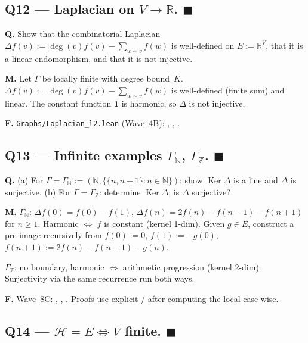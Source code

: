 \documentclass[11pt,a4paper]{article}
\newcommand{\done}[1]{\textcolor{donegreen}{\textbf{#1}}}
\newcommand{\lmod}[1]{\texttt{\small #1}}
\newcommand{\N}{\mathbb{N}}
\newcommand{\Z}{\mathbb{Z}}
\newcommand{\R}{\mathbb{R}}
\newcommand{\HH}{\mathcal{H}}
\renewcommand{\deg}{\operatorname{deg}}
\newcommand{\Ker}{\operatorname{Ker}}
\theoremstyle{plain}
\theoremstyle{definition}
\begin{document}
\subsection{Q12 --- Laplacian on $V \to \R$. \done{$\blacksquare$}}

\textbf{Q.} Show that the combinatorial Laplacian
$\Delta f(v) := \deg(v) f(v) - \sum_{w \sim v} f(w)$ is well-defined
on $E := \R^V$, that it is a linear endomorphism, and that it is
not injective.

\textbf{M.} Let $\Gamma$ be locally finite with degree bound~$K$.
$\Delta f(v) := \deg(v) f(v) - \sum_{w \sim v} f(w)$ is well-defined
(finite sum) and linear. The constant function $\mathbf 1$ is
harmonic, so $\Delta$ is not injective.

\textbf{F.} \lmod{Graphs/Laplacian\_l2.lean} (Wave~4B):
, ,
.

\subsection{Q13 --- Infinite examples $\Gamma_\N$, $\Gamma_\Z$. \done{$\blacksquare$}}

\textbf{Q.} (a) For $\Gamma = \Gamma_\N := (\N, \{\{n, n+1\} : n \in \N\})$:
show $\Ker \Delta$ is a line and $\Delta$ is surjective.
(b) For $\Gamma = \Gamma_\Z$: determine $\Ker \Delta$; is $\Delta$
surjective?

\textbf{M.}
\emph{$\Gamma_\N$}: $\Delta f(0) = f(0) - f(1)$, $\Delta f(n) =
2 f(n) - f(n-1) - f(n+1)$ for $n \geq 1$. Harmonic $\Leftrightarrow$
$f$ is constant (kernel 1-dim). Given $g \in E$, construct a
pre-image recursively from $f(0) := 0$, $f(1) := -g(0)$,
$f(n+1) := 2 f(n) - f(n-1) - g(n)$.

\emph{$\Gamma_\Z$}: no boundary, harmonic $\Leftrightarrow$ arithmetic
progression (kernel 2-dim). Surjectivity via the same recurrence run
both ways.

\textbf{F.} Wave~8C:
, ,
. Proofs use explicit
/ after computing the local
 case-wise.

\subsection{Q14 --- $\HH = E \iff V$ finite. \done{$\blacksquare$}}
\end{document}
